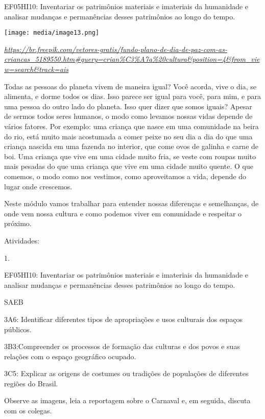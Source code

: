 EF05HI10: Inventariar os patrimônios materiais e imateriais da
humanidade e analisar mudanças e permanências desses patrimônios ao
longo do tempo.

\texttt{[image: media/image13.png]}

\href{https://br.freepik.com/vetores-gratis/fundo-plano-de-dia-de-paz-com-as-criancas_5189550.htm\#query=crian\%C3\%A7a\%20cultura\&position=4\&from_view=search\&track=ais}{\emph{https://br.freepik.com/vetores-gratis/fundo-plano-de-dia-de-paz-com-as-criancas\_5189550.htm\#query=crian\%C3\%A7a\%20cultura\&position=4\&from\_view=search\&track=ais}}

Todas as pessoas do planeta vivem de maneira igual? Você acorda, vive o
dia, se alimenta, e dorme todos os dias. Isso parece ser igual para
você, para mim, e para uma pessoa do outro lado do planeta. Isso quer
dizer que somos iguais? Apesar de sermos todos seres humanos, o modo
como levamos nossas vidas depende de vários fatores. Por exemplo: uma
criança que nasce em uma comunidade na beira do rio, está muito mais
acostumada a comer peixe no seu dia a dia do que uma criança nascida em
uma fazenda no interior, que come ovos de galinha e carne de boi. Uma
criança que vive em uma cidade muito fria, se veste com roupas muito
mais pesadas do que uma criança que vive em uma cidade muito quente. O
que comemos, o modo como nos vestimos, como aproveitamos a vida, depende
do lugar onde crescemos.

Neste módulo vamos trabalhar para entender nossas diferenças e
semelhanças, de onde vem nossa cultura e como podemos viver em
comunidade e respeitar o próximo.

Atividades:

1.

EF05HI10: Inventariar os patrimônios materiais e imateriais da
humanidade e analisar mudanças e permanências desses patrimônios ao
longo do tempo.

SAEB

3A6: Identificar diferentes tipos de apropriações e usos culturais dos
espaços públicos.

3B3:Compreender os processos de formação das culturas e dos povos e suas
relações com o espaço geográfico ocupado.

3C5: Explicar as origens de costumes ou tradições de populações de
diferentes regiões do Brasil.

Observe as imagens, leia a reportagem sobre o Carnaval e, em seguida,
discuta com os colegas.

